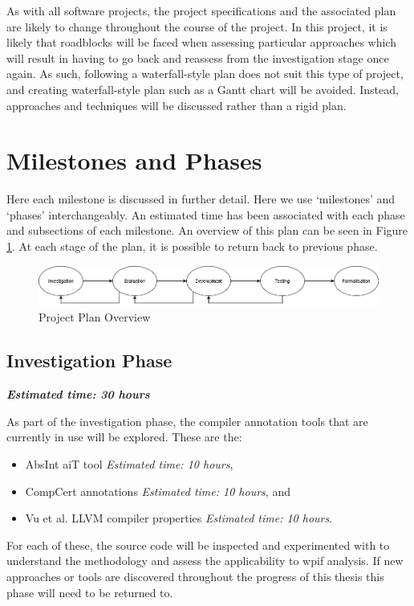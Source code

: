 \documentclass[twocolumn]{article}
\begin{document}
As with all software projects, the project specifications and the associated plan are likely to change throughout the course of the project. In this project, it is likely that roadblocks will be faced when assessing particular approaches which will result in having to go back and reassess from the investigation stage once again. As such, following a waterfall-style plan does not suit this type of project, and creating waterfall-style plan such as a Gantt chart will be avoided. Instead, approaches and techniques will be discussed rather than a rigid plan. 

\section{Milestones and Phases}
Here each milestone is discussed in further detail. Here we use `milestones' and `phases' interchangeably. An estimated time has been associated with each phase and subsections of each milestone.  An overview of this plan can be seen in Figure \ref{fig:plan}. At each stage of the plan, it is possible to return back to previous phase.

\begin{figure}
    \centering
    \includegraphics[width=\linewidth]{plan.png}
    \caption{Project Plan Overview}
    \label{fig:plan}
\end{figure}

\subsection{Investigation Phase}
\label{section:investigation}
\textbf{\textit{Estimated time: 30 hours}}

As part of the investigation phase, the compiler annotation tools that are currently in use will be explored. These are the:
\begin{itemize}
    \item AbsInt aiT tool \textit{Estimated time: 10 hours},
    \item CompCert annotations \textit{Estimated time: 10 hours}, and
    \item Vu et al. LLVM compiler properties \textit{Estimated time: 10 hours}.
\end{itemize}

For each of these, the source code will be inspected and experimented with to understand the methodology and assess the applicability to wpif analysis. If new approaches or tools are discovered throughout the progress of this thesis this phase will need to be returned to.\\
\end{document}
